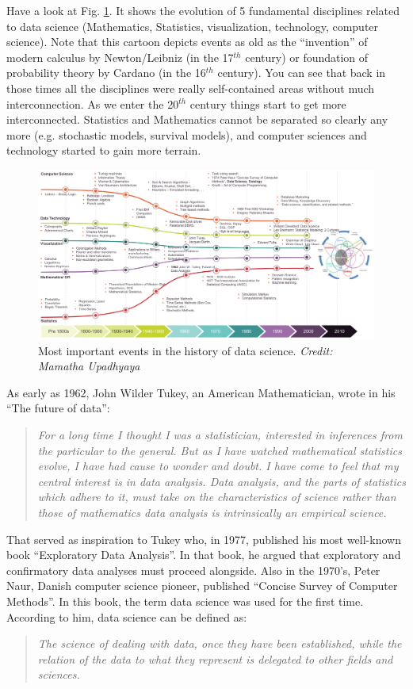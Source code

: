 \documentclass[10pt]{PhDthesisPSnPDF}%
\begin{document}
Have a look at Fig. \ref{fig:Analytics}. It shows the evolution of 5 fundamental disciplines related to data science (Mathematics, Statistics, visualization, technology, computer science). Note that this cartoon depicts events as old as the ``invention'' of modern calculus by Newton/Leibniz (in the 17$^{th}$ century) or foundation of probability theory by Cardano (in the 16$^{th}$ century). You can see that back in those times all the disciplines were really self-contained areas without much interconnection. As we enter the 20$^{th}$ century things start to get more interconnected. Statistics and Mathematics cannot be separated so clearly any more (e.g. stochastic models, survival models), and computer sciences and technology started to gain more terrain. 
\newpage
\begin{figure}[h]
	\begin{center}
			\includegraphics[scale=0.25]{HistoryCH1}
	\end{center}
	\caption{Most important events in the history of data science. \textit{Credit: Mamatha Upadhyaya}}
	\label{fig:Analytics}
\end{figure}

As early as 1962, John Wilder Tukey, an American Mathematician, wrote in his ``The future of data'':
\begin{quotation}
\textit{For a long time I thought I was a statistician, interested in inferences from the particular to the general. But as I have watched mathematical statistics evolve, I have had cause to wonder and doubt. I have come to feel that my central interest is in data analysis. Data analysis, and the parts of statistics which adhere to it, must take on the characteristics of science rather than those of mathematics data analysis is intrinsically an empirical science.}
\end{quotation} 

That served as inspiration to Tukey who, in 1977, published his most well-known book ``Exploratory Data Analysis''. In that book, he argued that exploratory and confirmatory data analyses must proceed alongside. Also in the 1970's, Peter Naur, Danish computer science pioneer, published ``Concise Survey of Computer Methods''. In this book, the term data science was used for the first time. According to him, data science can be defined as:
\begin{quotation}
\textit{The science of dealing with data, once they have been established, while the relation of the data to what they represent is delegated to other fields and sciences.}
\end{quotation}
\end{document}
